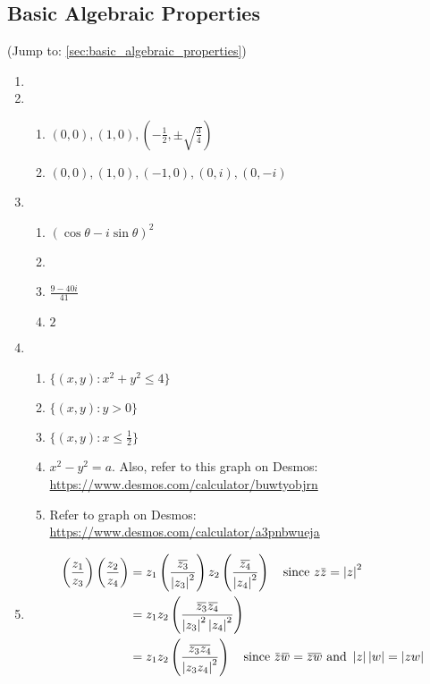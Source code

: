 \documentclass[11pt, oneside]{book}
\begin{document}
\subsection*{Basic Algebraic Properties} %
\label{sub:basic_algebraic_properties}

(Jump to: \cref{sec:basic_algebraic_properties})

\begin{enumerate}
	\item 
	\item \begin{enumerate}
		\item $(0, 0), (1, 0), (-\frac{1}{2} , \pm \sqrt{\frac{3}{4}})$
		\item $(0, 0), (1, 0), (-1, 0), (0, i), (0, -i)$
	\end{enumerate}
	\item \begin{enumerate}
		\item $(\cos \theta - i \sin \theta)^2$
		\item 
		\item $\frac{9 - 40i}{41}$
		\item $2$
	\end{enumerate}
	\item \begin{enumerate}
		\item $\{(x, y) : x^2 + y^2 \leq 4\}$
		\item $\{(x, y) : y > 0\}$
		\item $\{(x, y) : x \leq \frac{1}{2} \}$
		\item $x^2 - y^2 = a$. Also, refer to this graph on Desmos: \url{https://www.desmos.com/calculator/buwtyobjrn}
		\item Refer to graph on Desmos: \url{https://www.desmos.com/calculator/a3pnbwueja}
	\end{enumerate}
	\item \begin{align*}
		\left( \frac{z_1}{z_3} \right) \left( \frac{z_2}{z_4} \right)
			&= z_1 \left( \frac{\bar{z_3}}{\abs{z_3}^2} \right) z_2 \left( \frac{\bar{z_4}}{\abs{z_4}^2} \right) \quad \text{since } z\bar{z} = \abs{z}^2 \\
			&= z_1 z_2 \left( \frac{\bar{z_3} \bar{z_4}}{\abs{z_3}^2 \abs{z_4}^2} \right) \\
			&= z_1 z_2 \left( \frac{\bar{z_3 z_4}}{\abs{z_3 z_4}^2} \right) \quad \text{since } \bar{z}\bar{w} = \bar{zw} \text{ and } \abs{z}\abs{w} = \abs{zw} \\

\end{align*}
\end{enumerate}
\end{document}
